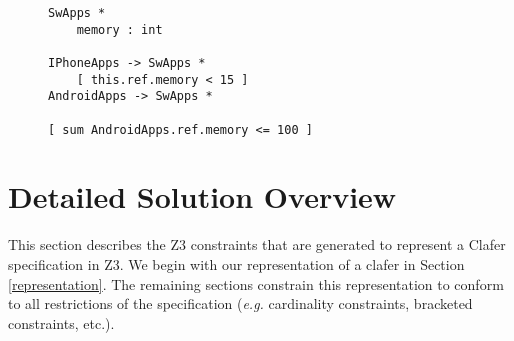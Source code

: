 \documentclass{easychair}
\newcommand{\eg}{\emph{e.g.}\xspace}
\begin{document}
\begin{figure}[!t]
\centering
\begin{lstlisting}[language=clafer, caption=A more complex mobile phone specification in clafer., label={listing:ClaferMoreComplexSpec}, xleftmargin=.2\textwidth, xrightmargin=.2\textwidth]
SwApps *
	memory : int

IPhoneApps -> SwApps *	
	[ this.ref.memory < 15 ]
AndroidApps -> SwApps *

[ sum AndroidApps.ref.memory <= 100 ]	
\end{lstlisting}%
\end{figure}


\section{Detailed Solution Overview}
\label{detailedsolution}
This section describes the Z3 constraints that are generated to represent a Clafer specification in Z3. We begin with our representation of a clafer in Section \ref{representation}. The remaining sections constrain this representation to conform to all restrictions of the specification (\eg cardinality constraints, bracketed constraints, etc.).
\end{document}
